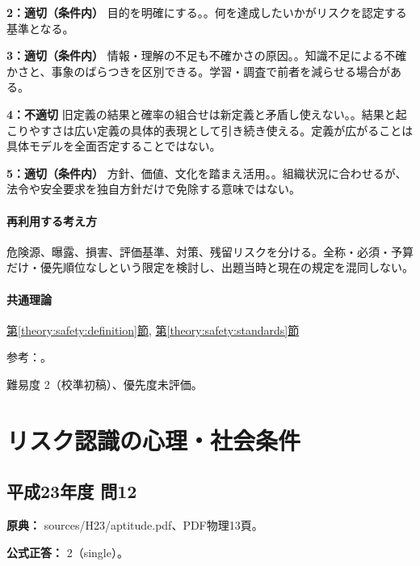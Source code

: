 \noindent\textbf{2：適切（条件内）} 目的を明確にする。。何を達成したいかがリスクを認定する基準となる。\par

\noindent\textbf{3：適切（条件内）} 情報・理解の不足も不確かさの原因。。知識不足による不確かさと、事象のばらつきを区別できる。学習・調査で前者を減らせる場合がある。\par

\noindent\textbf{4：不適切} 旧定義の結果と確率の組合せは新定義と矛盾し使えない。。結果と起こりやすさは広い定義の具体的表現として引き続き使える。定義が広がることは具体モデルを全面否定することではない。\par

\noindent\textbf{5：適切（条件内）} 方針、価値、文化を踏まえ活用。。組織状況に合わせるが、法令や安全要求を独自方針だけで免除する意味ではない。\par

\paragraph{再利用する考え方} 危険源、曝露、損害、評価基準、対策、残留リスクを分ける。全称・必須・予算だけ・優先順位なしという限定を検討し、出題当時と現在の規定を混同しない。

\paragraph{共通理論} \hyperref[theory:safety:definition]{第\ref*{theory:safety:definition}節}, \hyperref[theory:safety:standards]{第\ref*{theory:safety:standards}節}

\par 参考：\cite{saf_iso31000,saf_jis31010}。

\par 難易度 2（校準初稿）、優先度未評価。

\section{リスク認識の心理・社会条件}

\subsection{平成23年度 問12}
\label{q:h23-reg-apt-12}

\noindent\textbf{原典：} sources/H23/aptitude.pdf、PDF物理13頁。

\textbf{公式正答：} 2（single）。


